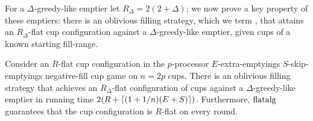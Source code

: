 For a $\Delta$-greedy-like emptier let $R_\Delta = 2(2+\Delta)$;
we now prove a key property of these emptiers: there is an
oblivious filling strategy, which we term , that
attains an $R_\Delta$-flat cup configuration against a
$\Delta$-greedy-like emptier, given cups of a known starting
fill-range.


\begin{lemma}
  \label{lem:flatalg}
  Consider an $R$-flat cup configuration in the $p$-processor
  $E$-extra-emptyings $S$-skip-emptyings negative-fill cup game on $n =
  2p$ cups. There is an oblivious filling strategy
   that achieves an $R_\Delta$-flat
  configuration of cups against a $\Delta$-greedy-like emptier in
  running time $2(R + \left\lceil (1+1/n)(E + S) \right\rceil)$. Furthermore,
  $\operatorname{\text{\textup{flatalg}}}$ guarantees that the cup configuration is $R$-flat on every round.
\end{lemma}

